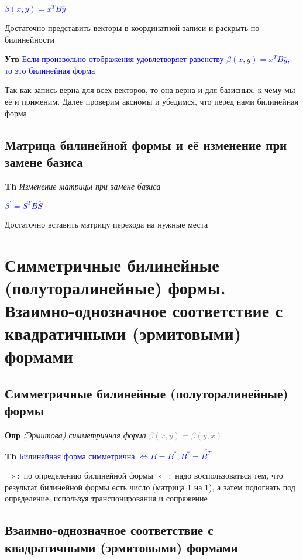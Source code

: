 \documentclass[a4paper, 14pt]{article}
\begin{document}
    \textcolor{blue}{$\beta (x, y) = x^T B \overline{y}$}
    
    Достаточно представить векторы в координатной записи и раскрыть по билинейности
    
    \textbf{Утв} \textcolor{blue}{Если произвольно отображения удовлетворяет
    равенству $\beta (x, y) = x^T B \overline{y}$, то это билинейная форма}
    
    Так как запись верна для всех векторов, то она верна и для базисных, к чему мы её и применим.
    Далее проверим аксиомы и убедимся, что перед нами билинейная форма
    
    \subsection{Матрица билинейной формы и её изменение при замене базиса}
    
    \textbf{Th} \textit{Изменение матрицы при замене базиса}
    
    \textcolor{blue}{$\beta^{'} = S^T B \overline{S}$}
    
    Достаточно вставить матрицу перехода на нужные места
    
    \section{Симметричные билинейные (полуторалинейные) формы.
    Взаимно-однозначное соответствие с квадратичными (эрмитовыми) формами}
    
    \subsection{Симметричные билинейные (полуторалинейные) формы}
    
    \textbf{Опр} \textit{(Эрмитова) симметричная форма} \textcolor{gray}{$\beta (x, y) = \overline{\beta (y, x)}$}
    
    \textbf{Th} \textcolor{blue}{Билинейная форма симметрична $\Leftrightarrow B = B^*, B^* = \overline{B^T}$}
    
    $\Rightarrow:$ по определению билинейной формы
    $\Leftarrow:$ надо воспользоваться тем, что результат билинейной формы есть число (матрица 1 на 1), а затем
    подогнать под определение, используя транспонирования и сопряжение
    
    \subsection{Взаимно-однозначное соответствие с квадратичными (эрмитовыми) формами}
    
\end{document}
